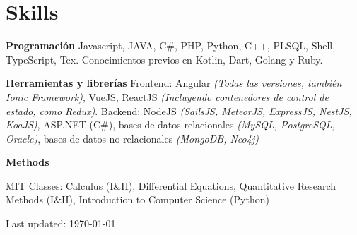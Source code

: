 \documentclass[letterpaper]{article}
\renewenvironment{itemize}{
  \begin{list}{}{
    \setlength{\leftmargin}{1.5em}
  }
}{
  \end{list}
}
\begin{document}
\section*{Skills}
\begin{itemize}
\item {\bf Programaci\'on}
\subitem Javascript, JAVA, C\#, PHP, Python, C++, PLSQL, Shell, TypeScript, Tex. Conocimientos previos en Kotlin, Dart, Golang y Ruby.

\item {\bf Herramientas y librer\'ias}
\subitem Frontend: Angular \textit{(Todas las versiones, tambi\'en Ionic Framework)}, VueJS, ReactJS \textit{(Incluyendo contenedores de control de estado, como Redux)}.
\subitem Backend: NodeJS \textit{(SailsJS, MeteorJS, ExpressJS, NestJS, KoaJS)}, ASP.NET (C\#),  bases de datos relacionales \textit{(MySQL, PostgreSQL, Oracle)}, bases de datos no relacionales \textit{(MongoDB, Neo4j)}

\item {\bf Methods}

\leftskip 0.5in
\parindent -0.5in

\subitem MIT Classes: Calculus (I\&II), Differential Equations, Quantitative Research Methods (I\&II), Introduction to Computer Science (Python) 

\end{itemize}

\bigskip

\begin{center}
  \begin{footnotesize}
    Last updated: \today \\
  \end{footnotesize}
\end{center}
\end{document}
